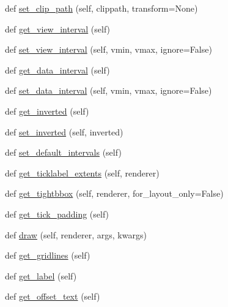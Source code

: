 \begin{DoxyCompactItemize}
\item 
def \hyperlink{classmatplotlib_1_1axis_1_1Axis_aaca09a77d695efb654f27261ccc856cd}{set\+\_\+clip\+\_\+path} (self, clippath, transform=None)
\item 
def \hyperlink{classmatplotlib_1_1axis_1_1Axis_a7f73b6c81a0f46a6024e757fbd0e6e09}{get\+\_\+view\+\_\+interval} (self)
\item 
def \hyperlink{classmatplotlib_1_1axis_1_1Axis_ab8e23f58bc8d65f09c7d519c4b0925a1}{set\+\_\+view\+\_\+interval} (self, vmin, vmax, ignore=False)
\item 
def \hyperlink{classmatplotlib_1_1axis_1_1Axis_a0e282e2efcabe35f67ee8d92138a60a7}{get\+\_\+data\+\_\+interval} (self)
\item 
def \hyperlink{classmatplotlib_1_1axis_1_1Axis_a8d64e783e8dab9a66528d084c5b86129}{set\+\_\+data\+\_\+interval} (self, vmin, vmax, ignore=False)
\item 
def \hyperlink{classmatplotlib_1_1axis_1_1Axis_a3e0dacd1e67ebd2774ea9f16d9c1b7d4}{get\+\_\+inverted} (self)
\item 
def \hyperlink{classmatplotlib_1_1axis_1_1Axis_aa25f0fb82131a32356f32c5cfddc772b}{set\+\_\+inverted} (self, inverted)
\item 
def \hyperlink{classmatplotlib_1_1axis_1_1Axis_aa438946ca6cd749ab253856c5193c490}{set\+\_\+default\+\_\+intervals} (self)
\item 
def \hyperlink{classmatplotlib_1_1axis_1_1Axis_aabe7d6c246c7a6f1147f0d120e80997b}{get\+\_\+ticklabel\+\_\+extents} (self, renderer)
\item 
def \hyperlink{classmatplotlib_1_1axis_1_1Axis_a5ef7ef8a1c36d64e3ee8c3969fa0aec0}{get\+\_\+tightbbox} (self, renderer, for\+\_\+layout\+\_\+only=False)
\item 
def \hyperlink{classmatplotlib_1_1axis_1_1Axis_ab21bc7f8db1abff63f1d5b131028a7c7}{get\+\_\+tick\+\_\+padding} (self)
\item 
def \hyperlink{classmatplotlib_1_1axis_1_1Axis_a19e9e9052739b30daf6a7a5d366b7b60}{draw} (self, renderer, args, kwargs)
\item 
def \hyperlink{classmatplotlib_1_1axis_1_1Axis_ad514097d1fadd4da2a3dc3754ebf9c7d}{get\+\_\+gridlines} (self)
\item 
def \hyperlink{classmatplotlib_1_1axis_1_1Axis_a8f3244a4685677397145ebd30bf7d67f}{get\+\_\+label} (self)
\item 
def \hyperlink{classmatplotlib_1_1axis_1_1Axis_a994e6f1d77cb61ee1046daa979dc6c30}{get\+\_\+offset\+\_\+text} (self)
\item 

\end{DoxyCompactItemize}
